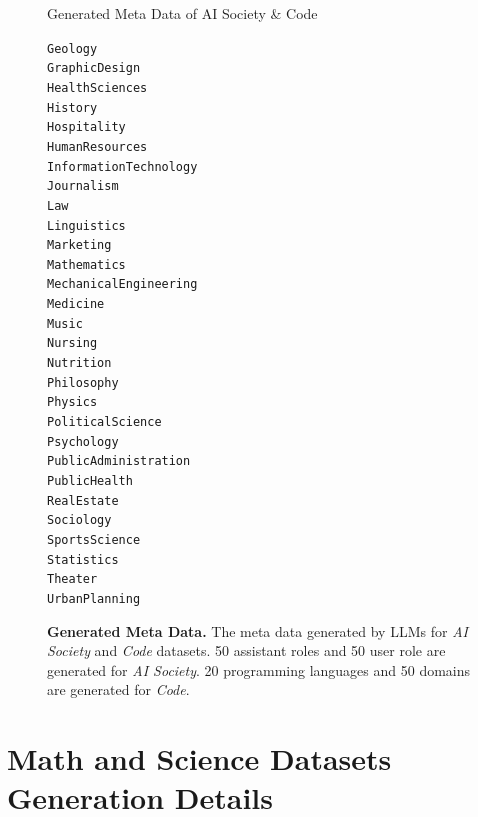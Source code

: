 \begin{figure}[h]
\begin{AIBox}{Generated Meta Data of AI Society \& Code}
{{{\begin{alltt}
						Geology \\
						Graphic Design \\
						Health Sciences \\
						History \\
						Hospitality \\
						Human Resources \\
						Information Technology \\
						Journalism \\
						Law \\
						Linguistics \\
						Marketing \\
						Mathematics \\
						Mechanical Engineering \\
						Medicine \\
						Music \\
						Nursing \\
						Nutrition \\
						Philosophy \\
						Physics \\
						Political Science \\
						Psychology \\
						Public Administration \\
						Public Health \\
						Real Estate \\
						Sociology \\
						Sports Science \\
						Statistics \\
						Theater \\
						Urban Planning
					\end{alltt}}%
			}
		}
	\end{AIBox}
	\caption{\textbf{Generated Meta Data.} The meta data generated by LLMs for \textit{AI Society} and \textit{Code} datasets. 50 assistant roles and 50 user role are generated for \textit{AI Society}. 20 programming languages and 50 domains are generated for \textit{Code}.}
	\label{fig:generated_meta_data}
\end{figure}

\clearpage

\section{Math and Science Datasets Generation Details}



